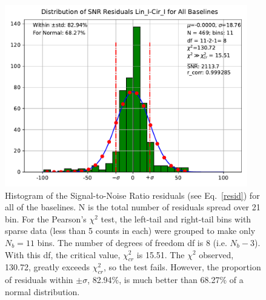 \documentclass[letterpaper,twoside,12pt]{article}
\begin{document}
\begin{figure}[ht!]
  \begin{center}
  \includegraphics[width=25pc]{Distr_SNR_Lin_I-Cir_I_Diff.pdf}
  \caption{\small  Histogram of the Signal-to-Noise Ratio residuals (see Eq.~\eqref{resid}) for all of the baselines. N is the total number of residuals spread over 21 bin. For the Pearson's $\chi^2$ test, the left-tail and right-tail bins with sparse data (less than 5 counts in each) were grouped to make only $N_b=11$ bins. The number of degrees of freedom df is 8 (i.e. $N_b-3$). With this df, the critical value, $\chi^2_{cr}$ is 15.51. The $\chi^2$ observed, 130.72, greatly exceeds $\chi^2_{cr}$, so the test fails. However, the proportion of residuals within $\pm\sigma$, 82.94\%, is much better than 68.27\% of a normal distribution.}
  \label{dsnr_distr}
  \end{center}
\end{figure}
\end{document}
